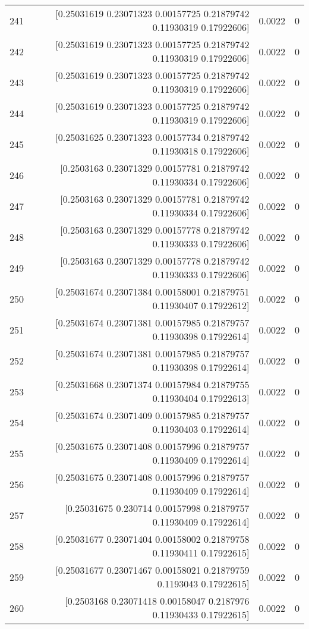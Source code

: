\begin{longtable}{lrrr}
241 & [0.25031619 0.23071323 0.00157725 0.21879742 0.11930319 0.17922606] & 0.0022 & 0 \\
242 & [0.25031619 0.23071323 0.00157725 0.21879742 0.11930319 0.17922606] & 0.0022 & 0 \\
243 & [0.25031619 0.23071323 0.00157725 0.21879742 0.11930319 0.17922606] & 0.0022 & 0 \\
244 & [0.25031619 0.23071323 0.00157725 0.21879742 0.11930319 0.17922606] & 0.0022 & 0 \\
245 & [0.25031625 0.23071323 0.00157734 0.21879742 0.11930318 0.17922606] & 0.0022 & 0 \\
246 & [0.2503163  0.23071329 0.00157781 0.21879742 0.11930334 0.17922606] & 0.0022 & 0 \\
247 & [0.2503163  0.23071329 0.00157781 0.21879742 0.11930334 0.17922606] & 0.0022 & 0 \\
248 & [0.2503163  0.23071329 0.00157778 0.21879742 0.11930333 0.17922606] & 0.0022 & 0 \\
249 & [0.2503163  0.23071329 0.00157778 0.21879742 0.11930333 0.17922606] & 0.0022 & 0 \\
250 & [0.25031674 0.23071384 0.00158001 0.21879751 0.11930407 0.17922612] & 0.0022 & 0 \\
251 & [0.25031674 0.23071381 0.00157985 0.21879757 0.11930398 0.17922614] & 0.0022 & 0 \\
252 & [0.25031674 0.23071381 0.00157985 0.21879757 0.11930398 0.17922614] & 0.0022 & 0 \\
253 & [0.25031668 0.23071374 0.00157984 0.21879755 0.11930404 0.17922613] & 0.0022 & 0 \\
254 & [0.25031674 0.23071409 0.00157985 0.21879757 0.11930403 0.17922614] & 0.0022 & 0 \\
255 & [0.25031675 0.23071408 0.00157996 0.21879757 0.11930409 0.17922614] & 0.0022 & 0 \\
256 & [0.25031675 0.23071408 0.00157996 0.21879757 0.11930409 0.17922614] & 0.0022 & 0 \\
257 & [0.25031675 0.230714   0.00157998 0.21879757 0.11930409 0.17922614] & 0.0022 & 0 \\
258 & [0.25031677 0.23071404 0.00158002 0.21879758 0.11930411 0.17922615] & 0.0022 & 0 \\
259 & [0.25031677 0.23071467 0.00158021 0.21879759 0.1193043  0.17922615] & 0.0022 & 0 \\
260 & [0.2503168  0.23071418 0.00158047 0.2187976  0.11930433 0.17922615] & 0.0022 & 0 \\

\end{longtable}
